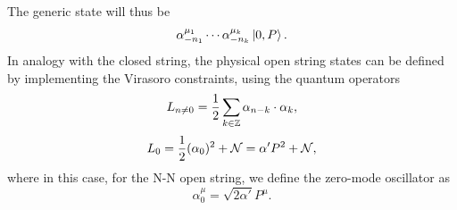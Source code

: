 The generic state will thus be 
\begin{equation}
    \alpha^{\mu_1}_{-n_1}\cdots\alpha^{\mu_k}_{-n_k}\ket{0,P}.
\end{equation}
In analogy with the closed string, the physical open string states can be defined by implementing the Virasoro constraints, using the quantum operators
\begin{equation}
    L_{n \neq 0} = \frac{1}{2}\sum_{k \in \mathbb{Z}}\alpha_{n - k}\cdot\alpha_k,
\end{equation}
\begin{equation}
    L_0 = \frac{1}{2}(\alpha_0)^2 + \mathcal{N} = \alpha'P^2 + \mathcal{N},
\end{equation}
where in this case, for the N-N open string, we define the zero-mode oscillator as 
\begin{equation}
    \alpha_0^\mu = \sqrt{2\alpha'}P^\mu.
\end{equation}

